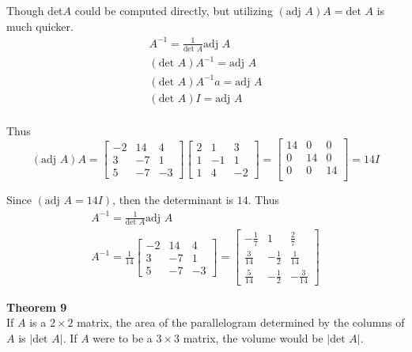 \documentclass{article}
\begin{document}
  Though det$ A $ could be computed directly, but utilizing $ (\text{adj }A)A=\text{det }A $ is much quicker.
  \[
    \begin{gathered}
    A^{-1}=\frac{1}{\text{det }A}\text{adj }A\\
    (\text{det }A)A^{-1}=\text{adj }A\\
    (\text{det }A)A^{-1}a=\text{adj }A\\
    (\text{det }A)I=\text{adj }A\\
    \end{gathered}
  \]

  Thus
  \[
    (\text{adj }A)A= \begin{bmatrix}
      -2 &14 &4\\
      3 &-7 &1\\
      5 &-7 &-3
    \end{bmatrix}
    \begin{bmatrix}
      2 &1 &3\\
      1 &-1 &1\\
      1 &4 &-2
    \end{bmatrix} = 
    \begin{bmatrix}
      14 &0 &0\\
      0 &14 &0\\
      0 &0 &14\\
    \end{bmatrix}=14I
  \]

  Since $ (\text{adj }A=14I) $, then the determinant is $ 14 $. Thus
  \[
    \begin{gathered}
    A^{-1}=\frac{1}{\text{det }A}\text{adj }A\\
    A^{-1}=\frac{1}{14} \begin{bmatrix}
      -2 &14 &4\\
      3 &-7 &1\\
      5 &-7 &-3
    \end{bmatrix} = \boxed{\begin{bmatrix}
      -\frac{1}{7} &1 &\frac{2}{7}\\
      \frac{3}{14} &-\frac{1}{2} &\frac{1}{14}\\
      \frac{5}{14} &-\frac{1}{2} &-\frac{3}{14}
    \end{bmatrix}}
    \end{gathered}
  \]

  \textbf{Theorem 9}\\
  If $ A $ is a $ 2 \times 2$ matrix, the area of the parallelogram determined by the columns of $ A $ is $ | \text{det }A | $. If $ A $ were to be a $ 3 \times 3 $ matrix, the volume would be $ | \text{det }A | $.
\end{document}
